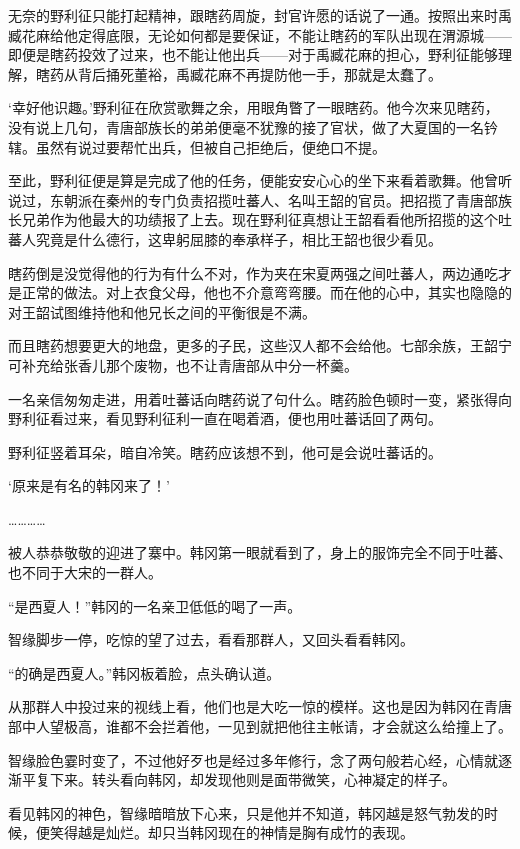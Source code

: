 无奈的野利征只能打起精神，跟瞎药周旋，封官许愿的话说了一通。按照出来时禹臧花麻给他定得底限，无论如何都是要保证，不能让瞎药的军队出现在渭源城——即便是瞎药投效了过来，也不能让他出兵——对于禹臧花麻的担心，野利征能够理解，瞎药从背后捅死董裕，禹臧花麻不再提防他一手，那就是太蠢了。

‘幸好他识趣。’野利征在欣赏歌舞之余，用眼角瞥了一眼瞎药。他今次来见瞎药，没有说上几句，青唐部族长的弟弟便毫不犹豫的接了官状，做了大夏国的一名钤辖。虽然有说过要帮忙出兵，但被自己拒绝后，便绝口不提。

至此，野利征便是算是完成了他的任务，便能安安心心的坐下来看着歌舞。他曾听说过，东朝派在秦州的专门负责招揽吐蕃人、名叫王韶的官员。把招揽了青唐部族长兄弟作为他最大的功绩报了上去。现在野利征真想让王韶看看他所招揽的这个吐蕃人究竟是什么德行，这卑躬屈膝的奉承样子，相比王韶也很少看见。

瞎药倒是没觉得他的行为有什么不对，作为夹在宋夏两强之间吐蕃人，两边通吃才是正常的做法。对上衣食父母，他也不介意弯弯腰。而在他的心中，其实也隐隐的对王韶试图维持他和他兄长之间的平衡很是不满。

而且瞎药想要更大的地盘，更多的子民，这些汉人都不会给他。七部余族，王韶宁可补充给张香儿那个废物，也不让青唐部从中分一杯羹。

一名亲信匆匆走进，用着吐蕃话向瞎药说了句什么。瞎药脸色顿时一变，紧张得向野利征看过来，看见野利征利一直在喝着酒，便也用吐蕃话回了两句。

野利征竖着耳朵，暗自冷笑。瞎药应该想不到，他可是会说吐蕃话的。

‘原来是有名的韩冈来了！’

…………

被人恭恭敬敬的迎进了寨中。韩冈第一眼就看到了，身上的服饰完全不同于吐蕃、也不同于大宋的一群人。

“是西夏人！”韩冈的一名亲卫低低的喝了一声。

智缘脚步一停，吃惊的望了过去，看看那群人，又回头看看韩冈。

“的确是西夏人。”韩冈板着脸，点头确认道。

从那群人中投过来的视线上看，他们也是大吃一惊的模样。这也是因为韩冈在青唐部中人望极高，谁都不会拦着他，一见到就把他往主帐请，才会就这么给撞上了。

智缘脸色霎时变了，不过他好歹也是经过多年修行，念了两句般若心经，心情就逐渐平复下来。转头看向韩冈，却发现他则是面带微笑，心神凝定的样子。

看见韩冈的神色，智缘暗暗放下心来，只是他并不知道，韩冈越是怒气勃发的时候，便笑得越是灿烂。却只当韩冈现在的神情是胸有成竹的表现。

